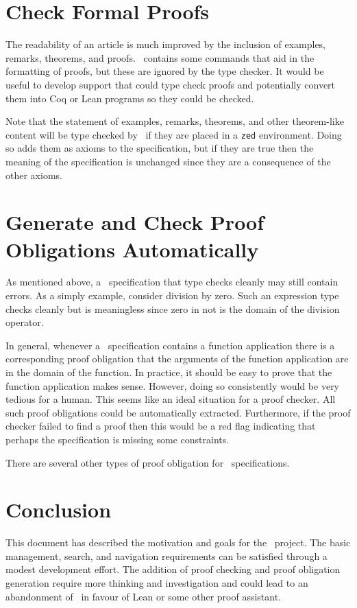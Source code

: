 \documentclass{amsart}
\begin{document}
 \hypertarget{check-formal-proof}{}
 \section{Check Formal Proofs}
 
 The readability of an article is much improved by the inclusion of examples, remarks, theorems, and proofs.
 \ZN\ contains some commands that aid in the formatting of proofs, but these are ignored by the \fuzz type checker.
 It would be useful to develop support that could type check proofs and potentially convert them into Coq or Lean programs
 so they could be checked.
 
 Note that the statement of examples, remarks, theorems, and other theorem-like content will be type checked by \fuzz\ if
 they are placed in a \texttt{zed} environment. 
 Doing so adds them as axioms to the specification, but if they are true then the meaning of the specification is unchanged
 since they are a consequence of the other axioms.
 
 \hypertarget{generate-and-check-proof-obligations-automatically}{}
 \section{Generate and Check Proof Obligations Automatically}
 
 As mentioned above, a \ZN\ specification that type checks cleanly may still contain errors.
 As a simply example, consider division by zero. 
 Such an expression type checks cleanly but is meaningless since zero in not is the domain of the division operator.
 
 In general, whenever a \ZN\ specification contains a function application there is a corresponding proof obligation
 that the arguments of the function application are in the domain of the function.
 In practice, it should be easy to prove that the function application makes sense.
 However, doing so consistently would be very tedious for a human.
 This seems like an ideal situation for a proof checker.
 All such proof obligations could be automatically extracted.
 Furthermore, if the proof checker failed to find a proof then this would be a red flag indicating that perhaps the specification
 is missing some constraints.
 
 There are several other types of proof obligation for \ZN\ specifications.
 
 \section{Conclusion}
 
 This document has described the motivation and goals for the \mathz\ project.
 The basic management, search, and navigation requirements can be satisfied through a modest development effort.
 The addition of proof checking and proof obligation generation require more thinking and investigation and could
 lead to an abandonment of \ZN\ in favour of Lean or some other proof assistant.
\end{document}
